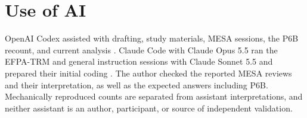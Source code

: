 \documentclass[10pt,conference]{IEEEtran}
\begin{document}
\section*{Use of AI}
OpenAI Codex assisted with drafting, study materials, MESA sessions, the P6B recount, and current analysis \cite{openai_codex_execution}. Claude Code with Claude Opus 5.5 ran the EFPA-TRM and general instruction sessions with Claude Sonnet 5.5 and prepared their initial coding \cite{anthropic_claude_code_cli}. The author checked the reported MESA reviews and their interpretation, as well as the expected answers including P6B. Mechanically reproduced counts are separated from assistant interpretations, and neither assistant is an author, participant, or source of independent validation.



\end{document}
